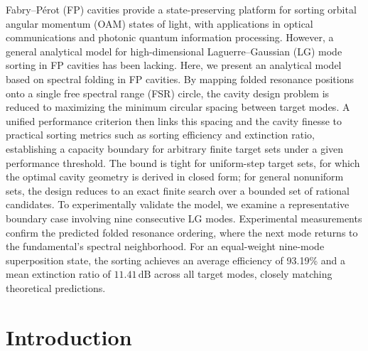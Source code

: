 \documentclass{optica-article}
\begin{document}
\begin{abstract*}
Fabry--P\'erot (FP) cavities provide a state-preserving platform for sorting orbital angular momentum (OAM) states of light, with applications in optical communications and photonic quantum information processing. However, a general analytical model for high-dimensional Laguerre--Gaussian (LG) mode sorting in FP cavities has been lacking. Here, we present an analytical model based on spectral folding in FP cavities. By mapping folded resonance positions onto a single free spectral range (FSR) circle, the cavity design problem is reduced to maximizing the minimum circular spacing between target modes. A unified performance criterion then links this spacing and the cavity finesse to practical sorting metrics such as sorting efficiency and extinction ratio, establishing a capacity boundary for arbitrary finite target sets under a given performance threshold. The bound is tight for uniform-step target sets, for which the optimal cavity geometry is derived in closed form; for general nonuniform sets, the design reduces to an exact finite search over a bounded set of rational candidates. To experimentally validate the model, we examine a representative boundary case involving nine consecutive LG modes. Experimental measurements confirm the predicted folded resonance ordering, where the next mode returns to the fundamental's spectral neighborhood. For an equal-weight nine-mode superposition state, the sorting achieves an average efficiency of 93.19\% and a mean extinction ratio of \(11.41\,\mathrm{dB}\) across all target modes, closely matching theoretical predictions.
\end{abstract*}

\section{Introduction}
\end{document}
